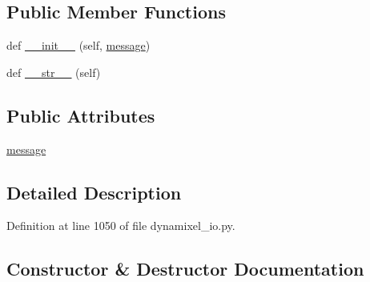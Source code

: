 \subsection*{Public Member Functions}
\begin{DoxyCompactItemize}
\item 
def \hyperlink{classdynamixel__driver_1_1dynamixel__io_1_1_dropped_packet_error_affcd2eb98974f23f28549d0977d984de}{\+\_\+\+\_\+init\+\_\+\+\_\+} (self, \hyperlink{classdynamixel__driver_1_1dynamixel__io_1_1_dropped_packet_error_a2fd7e42caadb7767233d228304a0f725}{message})
\item 
def \hyperlink{classdynamixel__driver_1_1dynamixel__io_1_1_dropped_packet_error_a07915193cc4b903f46fbc3db27d0f7d4}{\+\_\+\+\_\+str\+\_\+\+\_\+} (self)
\end{DoxyCompactItemize}
\subsection*{Public Attributes}
\begin{DoxyCompactItemize}
\item 
\hyperlink{classdynamixel__driver_1_1dynamixel__io_1_1_dropped_packet_error_a2fd7e42caadb7767233d228304a0f725}{message}
\end{DoxyCompactItemize}


\subsection{Detailed Description}


Definition at line 1050 of file dynamixel\+\_\+io.\+py.



\subsection{Constructor \& Destructor Documentation}
\mbox{\label{classdynamixel__driver_1_1dynamixel__io_1_1_dropped_packet_error_affcd2eb98974f23f28549d0977d984de}} 
